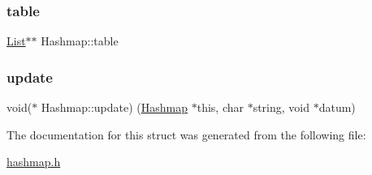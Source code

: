 \subsubsection{\texorpdfstring{table}{table}}
{\footnotesize\ttfamily \hyperlink{structList}{List}$\ast$$\ast$ Hashmap\+::table}

\mbox{\label{structHashmap_ac7249166e6305fcec9a7fd4be614c3cd}} 
\subsubsection{\texorpdfstring{update}{update}}
{\footnotesize\ttfamily void($\ast$  Hashmap\+::update) (\hyperlink{structHashmap}{Hashmap} $\ast$this, char $\ast$string, void $\ast$datum)}



The documentation for this struct was generated from the following file\+:\begin{DoxyCompactItemize}
\item 
\hyperlink{hashmap_8h}{hashmap.\+h}\end{DoxyCompactItemize}

